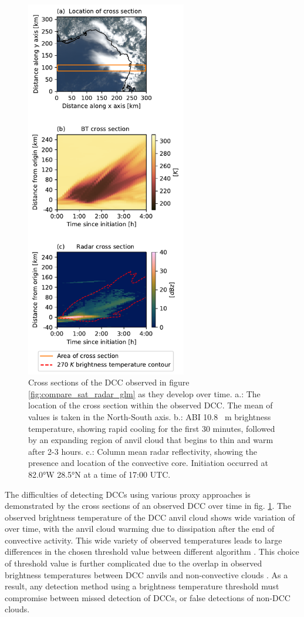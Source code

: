 \documentclass[amt, manuscript]{copernicus}
\begin{document}
\begin{figure}[t]
    \includegraphics[width=7cm]{figure02.pdf}
    \caption{Cross sections of the DCC observed in figure \ref{fig:compare_sat_radar_glm} as they develop over time. a.: The location of the cross section within the observed DCC. The mean of values is taken in the North-South axis. b.: ABI 10.8 \unit{\mu m} brightness temperature, showing rapid cooling for the first 30 minutes, followed by an expanding region of anvil cloud that begins to thin and warm after 2-3 hours. c.: Column mean radar reflectivity, showing the presence and location of the convective core. Initiation occurred at 82.0°W 28.5°N at a time of 17:00 UTC.}
    \label{fig:dcc_over_time}
\end{figure}

The difficulties of detecting DCCs using various proxy approaches is demonstrated by the cross sections of an observed DCC over time in fig. \ref{fig:dcc_over_time}.
The observed brightness temperature of the DCC anvil cloud shows wide variation of over time, with the anvil cloud warming due to dissipation after the end of convective activity.
This wide variety of observed temperatures leads to large differences in the chosen threshold value between different algorithm \citep[see discussion in][]{bennartz_convective_2012}.
This choice of threshold value is further complicated due to the overlap in observed brightness temperatures between DCC anvils and non-convective clouds \citep{konduru_new_2013}.
As a result, any detection method using a brightness temperature threshold must compromise between missed detection of DCCs, or false detections of non-DCC clouds.
\end{document}
